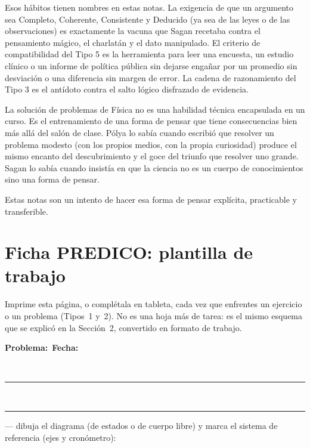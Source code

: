 \documentclass[11pt]{book}
\begin{document}
Esos hábitos tienen nombres en estas notas. La exigencia de que un argumento sea Completo, Coherente, Consistente y Deducido (ya sea de las leyes o de las observaciones) es exactamente la vacuna que Sagan recetaba contra el pensamiento mágico, el charlatán y el dato manipulado. El criterio de compatibilidad del Tipo 5 es la herramienta para leer una encuesta, un estudio clínico o un informe de política pública sin dejarse engañar por un promedio sin desviación o una diferencia sin margen de error. La cadena de razonamiento del Tipo 3 es el antídoto contra el salto lógico disfrazado de evidencia.

La solución de problemas de Física no es una habilidad técnica encapsulada en un curso. Es el entrenamiento de una forma de pensar que tiene consecuencias bien más allá del salón de clase. Pólya \cite{Polya1945} lo sabía cuando escribió que resolver un problema modesto (con los propios medios, con la propia curiosidad) produce el mismo encanto del descubrimiento y el goce del triunfo que resolver uno grande. Sagan lo sabía cuando insistía en que la ciencia no es un cuerpo de conocimientos sino una forma de pensar.

Estas notas son un intento de hacer esa forma de pensar explícita, practicable y transferible.
\newpage

\section*{Ficha PREDICO: plantilla de trabajo}

\noindent\small Imprime esta página, o complétala en tableta, cada vez que enfrentes un ejercicio o un problema (Tipos~1 y~2). No es una hoja más de tarea: es el mismo esquema que se explicó en la Sección~2, convertido en formato de trabajo.

\vspace{2mm}
\noindent\textbf{Problema:}\ \hrulefill \hfill \textbf{Fecha:}\ \hrulefill

\vspace{3mm}
\\
\rule{\linewidth}{0.3pt}\\[4mm]
\rule{\linewidth}{0.3pt}

\vspace{3mm}
 --- dibuja el diagrama (de estados o de cuerpo libre) y marca el sistema de referencia (ejes y cronómetro):
\vspace{1mm}
\begin{center}\end{center}
\end{document}
